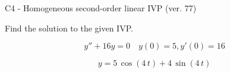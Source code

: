 \begin{exercise}
  \begin{exerciseTitle}C4 - Homogeneous second-order linear IVP (ver. 77)\end{exerciseTitle}
  \begin{exerciseStatement}
    
Find the solution to the given IVP.

    
\[y''+16y = 0 \hspace{1em} y(0) = 5 , y'(0) = 16\]

  \end{exerciseStatement}
  \begin{exerciseAnswer}
    
\[y= 5 \, \cos\left(4 \, t\right) + 4 \, \sin\left(4 \, t\right)\]

  \end{exerciseAnswer}
\end{exercise}